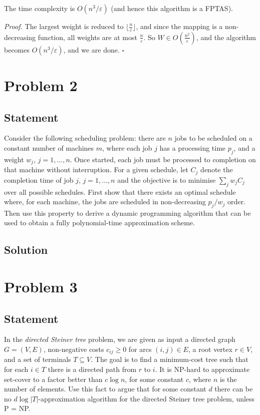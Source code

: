 \documentclass[a4paper]{article}
\newenvironment{proof}{\begin{breakbox}\textit{Proof.}}{\hfill$\square$\end{breakbox}}
\newcommand{\eps}{\varepsilon}
\begin{document}
\begin{claim}
    The time complexity is $O(n^3 / \eps)$ (and hence this algorithm is a FPTAS).
\end{claim}
\begin{proof}
    The largest weight is reduced to $\lfloor\frac{n}{\eps}\rfloor$, and since the mapping is a non-decreasing function, all weights are at most $\frac{n}{\eps}$. So $W \in O(\frac{n^2}{\eps})$,
    and the algorithm becomes $O(n^3 / \eps)$, and we are done.
\end{proof}

\newpage

\section{Problem 2}
\subsection{Statement}
Consider the following scheduling problem: there are $n$ jobs to be scheduled on a constant number of machines $m$, where each job $j$ has a processing time $p_j$, and a weight $w_j$, $j = 1, \ldots, n$.
Once started, each job must be processed to completion on that machine without interruption. For a given schedule, let $C_j$ denote the completion time of job $j$, $j = 1, \ldots, n$ and the
objective is to minimise $\sum_j w_j C_j$ over all possible schedules. First show that there exists an optimal schedule where, for each machine, the jobs are scheduled in non-decreasing
$p_j/w_j$ order. Then use this property to derive a dynamic programming algorithm that can be used to obtain a fully polynomial-time approximation scheme.
\subsection{Solution}
\newpage

\section{Problem 3}
\subsection{Statement}
In the \emph{directed Steiner tree} problem, we are given as input a directed graph $G = (V, E)$, non-negative costs $c_{ij} \ge 0$ for arcs $(i, j) \in E$, a root vertex $r \in V$, and a set of
terminals $T \subseteq V$. The goal is to find a minimum-cost tree such that for each $i\in T$ there is a directed path from $r$ to $i$. It is NP-hard to approximate set-cover to a factor better than
$c\log n$, for some constant $c$, where $n$ is the number of elements. Use this fact to argue that for some constant $d$ there can be no $d \log |T|$-approximation algorithm for the directed Steiner tree problem, unless P = NP.
\end{document}
